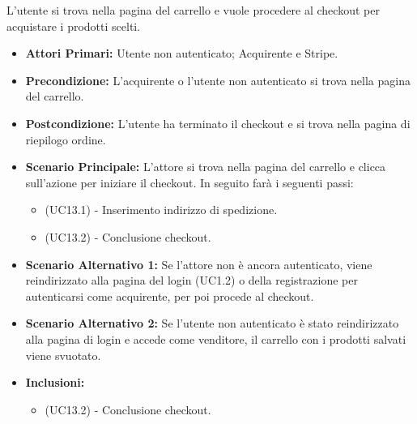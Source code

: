 L'utente si trova nella pagina del carrello e vuole procedere al checkout per acquistare i prodotti scelti.
\begin{itemize}
    \item \textbf{Attori Primari:} Utente non autenticato; Acquirente e Stripe.
    \item \textbf{Precondizione:} L'acquirente o l'utente non autenticato si trova nella pagina del carrello.
    \item \textbf{Postcondizione:} L'utente ha terminato il checkout e si trova nella pagina di riepilogo ordine.
    \item \textbf{Scenario Principale:} L'attore si trova nella pagina del carrello e clicca sull'azione per iniziare il checkout. In seguito farà i seguenti passi:
    \begin{itemize}
        \item (UC13.1) - Inserimento indirizzo di spedizione.
        \item (UC13.2) - Conclusione checkout.
    \end{itemize}
    \item \textbf{Scenario Alternativo 1:} Se l'attore non è ancora autenticato, viene reindirizzato alla pagina del login (UC1.2) o della registrazione per autenticarsi come acquirente, per poi procede al checkout.
    \item \textbf{Scenario Alternativo 2:} Se l'utente non autenticato è stato reindirizzato alla pagina di login e accede come venditore, il carrello con i prodotti salvati viene svuotato.
    \item \textbf{Inclusioni:}
    \begin{itemize}
        \item (UC13.2) - Conclusione checkout.
    \end{itemize}
\end{itemize}

\resetSubUC

